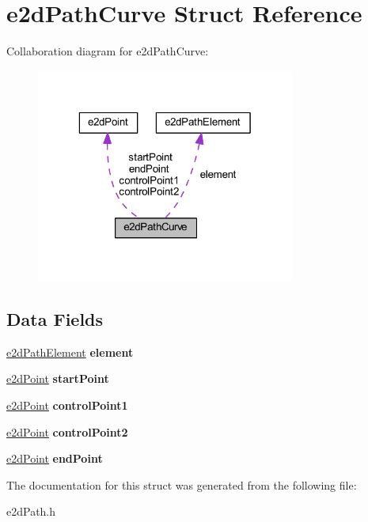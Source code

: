\hypertarget{structe2dPathCurve}{\section{e2d\-Path\-Curve Struct Reference}
\label{structe2dPathCurve}
}


Collaboration diagram for e2d\-Path\-Curve\-:\nopagebreak
\begin{figure}[H]
\begin{center}
\leavevmode
\includegraphics[width=241pt]{structe2dPathCurve__coll__graph}
\end{center}
\end{figure}
\subsection*{Data Fields}
\begin{DoxyCompactItemize}
\item 
\hypertarget{structe2dPathCurve_a88e514266530010a1a3b08198b3cc763}{\hyperlink{structe2dPathElement}{e2d\-Path\-Element} {\bfseries element}}\label{structe2dPathCurve_a88e514266530010a1a3b08198b3cc763}

\item 
\hypertarget{structe2dPathCurve_a96868a222a14861eb6e64214328c6159}{\hyperlink{structe2dPoint}{e2d\-Point} {\bfseries start\-Point}}\label{structe2dPathCurve_a96868a222a14861eb6e64214328c6159}

\item 
\hypertarget{structe2dPathCurve_a5fe58a06185a33704c2cc77c8a58fb0d}{\hyperlink{structe2dPoint}{e2d\-Point} {\bfseries control\-Point1}}\label{structe2dPathCurve_a5fe58a06185a33704c2cc77c8a58fb0d}

\item 
\hypertarget{structe2dPathCurve_a929324aa1e3527d71e312e5f80cb24db}{\hyperlink{structe2dPoint}{e2d\-Point} {\bfseries control\-Point2}}\label{structe2dPathCurve_a929324aa1e3527d71e312e5f80cb24db}

\item 
\hypertarget{structe2dPathCurve_a0ae59a21d141722d36c0ebc740587f9d}{\hyperlink{structe2dPoint}{e2d\-Point} {\bfseries end\-Point}}\label{structe2dPathCurve_a0ae59a21d141722d36c0ebc740587f9d}

\end{DoxyCompactItemize}


The documentation for this struct was generated from the following file\-:\begin{DoxyCompactItemize}
\item 
e2d\-Path.\-h\end{DoxyCompactItemize}
